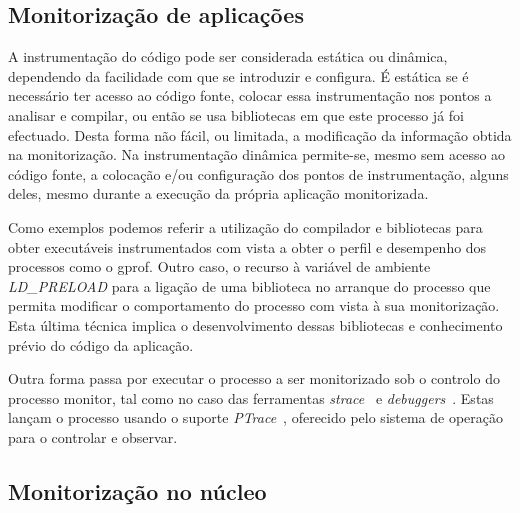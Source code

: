 \documentclass[a4paper]{llncs}
\newcommand{\td}[1]{\todo[inline]{#1}}
\begin{document}
\subsection{Monitorização de aplicações}
\label{sub:user_level_monitor}

A instrumentação do código pode ser considerada estática ou dinâmica, dependendo da facilidade com que se introduzir e configura. É estática se é necessário ter acesso ao código fonte, colocar essa instrumentação nos pontos a analisar e compilar, ou então se usa bibliotecas em que este processo já foi efectuado. Desta forma não fácil, ou limitada, a modificação da informação obtida na monitorização. Na instrumentação dinâmica permite-se, mesmo sem acesso ao código fonte, a colocação e/ou configuração dos pontos de instrumentação, alguns deles, mesmo durante a execução da própria aplicação monitorizada. 


Como exemplos podemos referir a utilização do compilador e bibliotecas para obter executáveis instrumentados com vista a obter o perfil e desempenho dos processos como o gprof\cite{Graham:1982:GCG:800230.806987}.
Outro caso, o recurso à variável de ambiente \textit{LD\_PRELOAD} para a ligação de uma biblioteca no arranque do processo que permita modificar o comportamento do processo com vista à sua monitorização. Esta última técnica implica o desenvolvimento dessas bibliotecas e conhecimento prévio do código da aplicação.

Outra forma passa por executar o processo a ser monitorizado sob o controlo do processo monitor, tal como no caso das ferramentas \textit{strace}~\cite{strace} e  \textit{debuggers}~\cite{gdb}. Estas lançam o processo usando o suporte \textit{PTrace}~\cite{ptrace}, oferecido pelo sistema de operação para o controlar e observar. 

\subsection{Monitorização no núcleo}
\label{sub_kernel_instrumentation}
\end{document}
